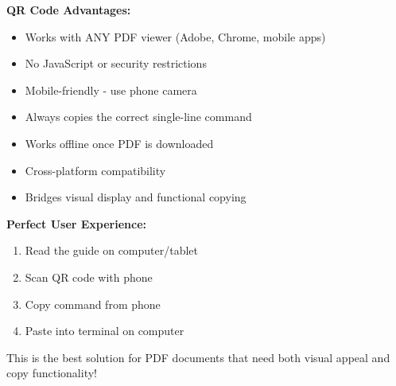 \documentclass{article}
\begin{document}
\begin{infobox}
\textbf{QR Code Advantages:}
\begin{itemize}
    \item Works with ANY PDF viewer (Adobe, Chrome, mobile apps)
    \item No JavaScript or security restrictions
    \item Mobile-friendly - use phone camera
    \item Always copies the correct single-line command
    \item Works offline once PDF is downloaded
    \item Cross-platform compatibility
    \item Bridges visual display and functional copying
\end{itemize}

\textbf{Perfect User Experience:}
\begin{enumerate}
    \item Read the guide on computer/tablet
    \item Scan QR code with phone
    \item Copy command from phone
    \item Paste into terminal on computer
\end{enumerate}

This is the best solution for PDF documents that need both visual appeal and copy functionality!
\end{infobox}
\end{document}
